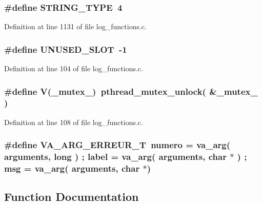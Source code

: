 \subsubsection[{STRING\_\-TYPE}]{\setlength{\rightskip}{0pt plus 5cm}\#define STRING\_\-TYPE~4}\label{log__functions_8c_b5eb05d3b545c8fc57952cb4afb121ca}




Definition at line 1131 of file log\_\-functions.c.
\subsubsection[{UNUSED\_\-SLOT}]{\setlength{\rightskip}{0pt plus 5cm}\#define UNUSED\_\-SLOT~-1}\label{log__functions_8c_20af6dd1f5a589e2a11eb37c1ea3ee96}




Definition at line 104 of file log\_\-functions.c.
\subsubsection[{V}]{\setlength{\rightskip}{0pt plus 5cm}\#define V(\_\-mutex\_\-)~pthread\_\-mutex\_\-unlock( \&\_\-mutex\_\- )}\label{log__functions_8c_5a9b6f8030959507eee365b226d63b00}




Definition at line 108 of file log\_\-functions.c.
\subsubsection[{VA\_\-ARG\_\-ERREUR\_\-T}]{\setlength{\rightskip}{0pt plus 5cm}\#define VA\_\-ARG\_\-ERREUR\_\-T~numero = va\_\-arg( arguments, long ) ; label  = va\_\-arg( arguments, char $\ast$ ) ; msg    = va\_\-arg( arguments, char $\ast$)}\label{log__functions_8c_d1f4a1fa20e92510fc4ed8840c83900d}




\subsection{Function Documentation}
